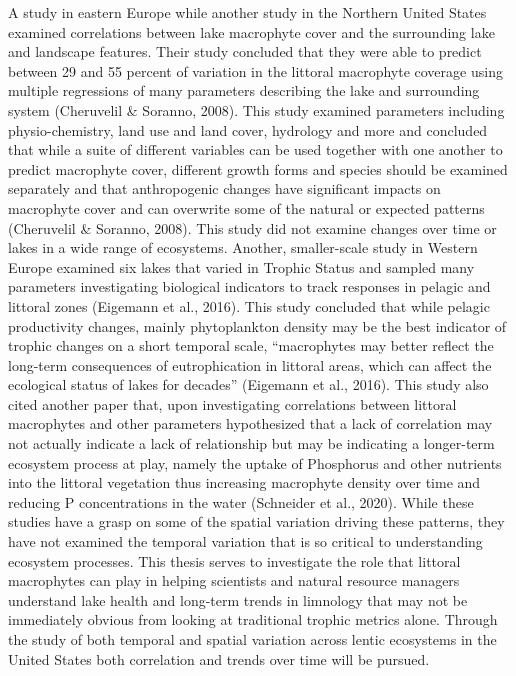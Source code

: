 \documentclass[
]{book}
\begin{document}
A study in eastern Europe while another study in the Northern United States examined correlations between lake macrophyte cover and the surrounding lake and landscape features. Their study concluded that they were able to predict between 29 and 55 percent of variation in the littoral macrophyte coverage using multiple regressions of many parameters describing the lake and surrounding system (Cheruvelil \& Soranno, 2008). This study examined parameters including physio-chemistry, land use and land cover, hydrology and more and concluded that while a suite of different variables can be used together with one another to predict macrophyte cover, different growth forms and species should be examined separately and that anthropogenic changes have significant impacts on macrophyte cover and can overwrite some of the natural or expected patterns (Cheruvelil \& Soranno, 2008). This study did not examine changes over time or lakes in a wide range of ecosystems. Another, smaller-scale study in Western Europe examined six lakes that varied in Trophic Status and sampled many parameters investigating biological indicators to track responses in pelagic and littoral zones (Eigemann et al., 2016). This study concluded that while pelagic productivity changes, mainly phytoplankton density may be the best indicator of trophic changes on a short temporal scale, ``macrophytes may better reflect the long-term consequences of eutrophication in littoral areas, which can affect the ecological status of lakes for decades'' (Eigemann et al., 2016). This study also cited another paper that, upon investigating correlations between littoral macrophytes and other parameters hypothesized that a lack of correlation may not actually indicate a lack of relationship but may be indicating a longer-term ecosystem process at play, namely the uptake of Phosphorus and other nutrients into the littoral vegetation thus increasing macrophyte density over time and reducing P concentrations in the water (Schneider et al., 2020).
While these studies have a grasp on some of the spatial variation driving these patterns, they have not examined the temporal variation that is so critical to understanding ecosystem processes. This thesis serves to investigate the role that littoral macrophytes can play in helping scientists and natural resource managers understand lake health and long-term trends in limnology that may not be immediately obvious from looking at traditional trophic metrics alone. Through the study of both temporal and spatial variation across lentic ecosystems in the United States both correlation and trends over time will be pursued.
\end{document}
